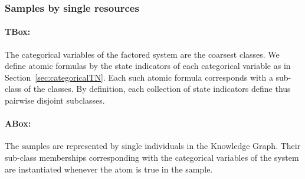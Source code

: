 \subsubsection{Samples by single resources}

\paragraph{TBox:} The categorical variables of the factored system are the coarsest classes.
We define atomic formulas by the state indicators of each categorical variable as in Section~\ref{sec:categoricalTN}.
Each such atomic formula corresponds with a sub-class of the classes.
By definition, each collection of state indicators define thus pairwise disjoint subclasses.

\paragraph{ABox:} The samples are represented by single individuals in the Knowledge Graph.
Their sub-class memberships corresponding with the categorical variables of the system are instantiated whenever the atom is true in the sample.


